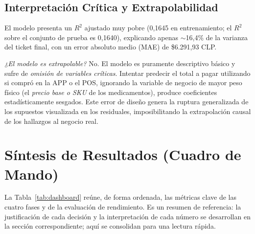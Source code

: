 \documentclass[12pt,letterpaper]{article}
\begin{document}
\subsection{Interpretación Crítica y Extrapolabilidad}
El modelo presenta un $R^2$ ajustado muy pobre (0,1645 en entrenamiento; el $R^2$ sobre el conjunto de prueba es 0,1640), explicando apenas $\sim$16,4\% de la varianza del ticket final, con un error absoluto medio (MAE) de \$6.291,93 CLP.

\textit{¿El modelo es extrapolable?} 
No. El modelo es puramente descriptivo básico y sufre de \textit{omisión de variables críticas}. Intentar predecir el total a pagar utilizando si compró en la APP o el POS, ignorando la variable de negocio de mayor peso físico (el \textit{precio base o SKU} de los medicamentos), produce coeficientes estadísticamente sesgados. Este error de diseño genera la ruptura generalizada de los supuestos visualizada en los residuales, imposibilitando la extrapolación causal de los hallazgos al negocio real.

\section{Síntesis de Resultados (Cuadro de Mando)}
\label{sec:dashboard}
La Tabla~\ref{tab:dashboard} reúne, de forma ordenada, las métricas clave de las cuatro fases y de la
evaluación de rendimiento. Es un resumen de referencia: la justificación de cada decisión y la
interpretación de cada número se desarrollan en la sección correspondiente; aquí se consolidan para
una lectura rápida.
\end{document}
